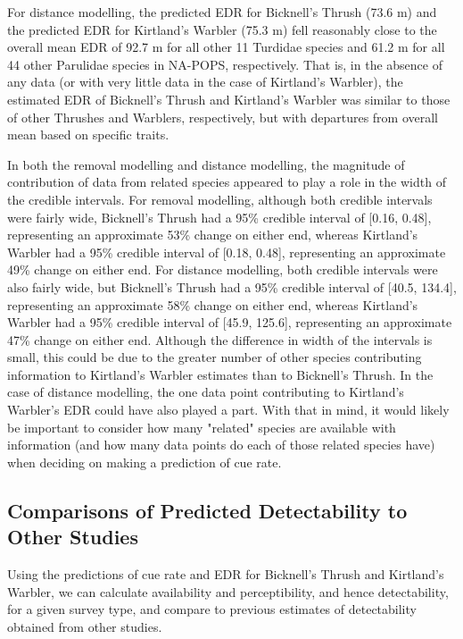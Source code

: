 \documentclass[12pt]{article}
\begin{document}
\par For distance modelling, the predicted EDR for Bicknell's Thrush (73.6 m) and the predicted EDR for Kirtland's Warbler (75.3 m) fell reasonably close to the overall mean EDR of 92.7 m for all other 11 Turdidae species and 61.2 m for all 44 other Parulidae species in NA-POPS, respectively.
That is, in the absence of any data (or with very little data in the case of Kirtland’s Warbler), the estimated EDR of Bicknell’s Thrush and Kirtland’s Warbler was similar to those of other Thrushes and Warblers, respectively, but with departures from overall mean based on specific traits.

\par In both the removal modelling and distance modelling, the magnitude of contribution of data from related species appeared to play a role in the width of the credible intervals. 
For removal modelling, although both credible intervals were fairly wide, Bicknell’s Thrush had a 95\% credible interval of [0.16, 0.48], representing an approximate 53\% change on either end, whereas Kirtland's Warbler had a 95\% credible interval of [0.18, 0.48], representing an approximate 49\% change on either end.
For distance modelling, both credible intervals were also fairly wide, but Bicknell's Thrush had a 95\% credible interval of [40.5, 134.4], representing an approximate 58\% change on either end, whereas Kirtland's Warbler had a 95\% credible interval of [45.9, 125.6], representing an approximate 47\% change on either end.
Although the difference in width of the intervals is small, this could be due to the greater number of other species contributing information to Kirtland's Warbler estimates than to Bicknell's Thrush.
In the case of distance modelling, the one data point contributing to Kirtland's Warbler's EDR could have also played a part.
With that in mind, it would likely be important to consider how many "related" species are available with information (and how many data points do each of those related species have) when deciding on making a prediction of cue rate.

\subsection{Comparisons of Predicted Detectability to Other Studies}

\par Using the predictions of cue rate and EDR for Bicknell’s Thrush and Kirtland’s Warbler, we can calculate availability and perceptibility, and hence detectability, for a given survey type, and compare to previous estimates of detectability obtained from other studies.
\end{document}
